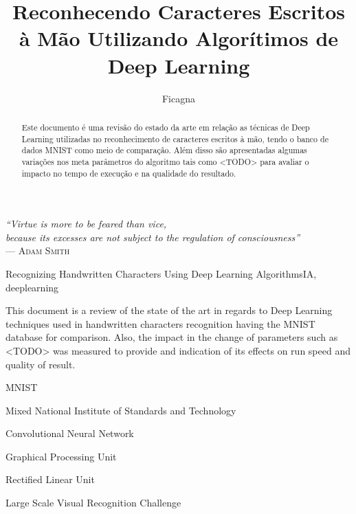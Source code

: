 \documentclass[cic,tc]{iiufrgs}
\title{Reconhecendo Caracteres Escritos à Mão Utilizando Algorítimos de Deep Learning}
\author{Ficagna}{Alan}
\date{}{2015}
\begin{document}
\maketitle

\clearpage
\begin{flushright}
  \mbox{}\vfill
  {\sffamily\itshape{}
    ``Virtue is more to be feared than vice,\\
    because its excesses are not subject to the regulation of consciousness''\\}
  --- \textsc{Adam Smith}
\end{flushright}

\begin{abstract}

  Este documento é uma revisão do estado da arte em relação as técnicas de
Deep Learning utilizadas no reconhecimento de caracteres escritos à mão, tendo o
banco de dados MNIST como meio de comparação. Além disso são apresentadas
algumas variações nos meta parâmetros do algoritmo tais como <TODO> para
avaliar o impacto no tempo de execução e na qualidade do resultado.
\end{abstract}

\begin{englishabstract}{Recognizing Handwritten Characters Using Deep Learning Algorithms}{IA, deeplearning} %

  This document is a review of the state of the art in regards to Deep Learning
techniques used in handwritten characters recognition having the MNIST
database for comparison. Also, the impact in the change of parameters such as
<TODO> was measured to provide and indication of its effects on run speed and
quality of result.

\end{englishabstract}

\listoffigures
\listoftables
\begin{listofabbrv}{MNIST} %
 \item[MNIST] Mixed National Institute of Standards and Technology
 \item[CNN] Convolutional Neural Network
 \item[GPU] Graphical Processing Unit
 \item[ReLU] Rectified Linear Unit
 \item[ILSVRC] Large Scale Visual Recognition Challenge
\end{listofabbrv}
\tableofcontents
\end{document}
